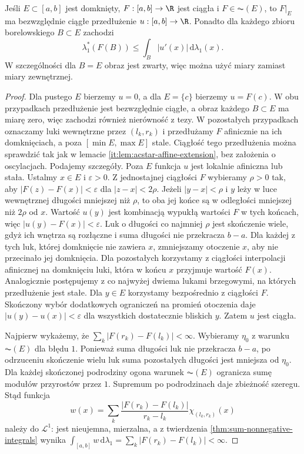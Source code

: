 \begin{lemat}\label{it:lem:ac-affine-extension}
Jeśli $E\subset[a,b]$ jest domknięty, $F:[a,b]\to\R$ jest ciągła i $F\in\AC(E)$, to $F|_E$ ma bezwzględnie ciągłe przedłużenie $u:[a,b]\to\R$. Ponadto dla każdego zbioru borelowskiego $B\subset E$ zachodzi
\[
 \lambda_1^*(F(B))\le\int_B|u'(x)|\,\mathrm d\lambda_1(x).
\]
W szczególności dla $B=E$ obraz jest zwarty, więc można użyć miary zamiast miary zewnętrznej.
\end{lemat}
\begin{proof}
Dla pustego $E$ bierzemy $u=0$, a dla $E=\{c\}$ bierzemy $u=F(c)$. W obu przypadkach przedłużenie jest bezwzględnie ciągłe, a obraz każdego $B\subset E$ ma miarę zero, więc zachodzi również nierówność z tezy. W pozostałych przypadkach oznaczamy luki wewnętrzne przez $(l_k,r_k)$ i przedłużamy $F$ afinicznie na ich domknięciach, a poza $[\min E,\max E]$ stale. Ciągłość tego przedłużenia można sprawdzić tak jak
w lemacie \ref{it:lem:acstar-affine-extension}, bez
założenia o oscylacjach. Podajemy szczegóły.
Poza $E$ funkcja $u$ jest lokalnie afiniczna lub stała.
Ustalmy $x\in E$ i $\varepsilon>0$. Z jednostajnej
ciągłości $F$ wybieramy $\rho>0$ tak, aby
$|F(z)-F(x)|<\varepsilon$ dla $|z-x|<2\rho$.
Jeżeli $|y-x|<\rho$ i $y$ leży w luce wewnętrznej
długości mniejszej niż $\rho$, to oba jej końce są
w odległości mniejszej niż $2\rho$ od $x$.
Wartość $u(y)$ jest kombinacją wypukłą wartości $F$
w tych końcach, więc $|u(y)-F(x)|<\varepsilon$.
Luk o długości co najmniej $\rho$ jest skończenie
wiele, gdyż ich wnętrza są rozłączne i suma długości
nie przekracza $b-a$. Dla każdej z tych luk, której
domknięcie nie zawiera $x$, zmniejszamy otoczenie
$x$, aby nie przecinało jej domknięcia. Dla pozostałych
korzystamy z ciągłości interpolacji afinicznej na
domknięciu luki, która w końcu $x$ przyjmuje wartość
$F(x)$. Analogicznie postępujemy z co najwyżej dwiema
lukami brzegowymi, na których przedłużenie jest stałe.
Dla $y\in E$ korzystamy bezpośrednio z ciągłości $F$.
Skończony wybór dodatkowych ograniczeń na promień
otoczenia daje $|u(y)-u(x)|<\varepsilon$ dla wszystkich
dostatecznie bliskich $y$. Zatem $u$ jest ciągła.

Najpierw wykażemy, że $\sum_k|F(r_k)-F(l_k)|<\infty$. Wybieramy $\eta_0$ z warunku $\AC(E)$ dla błędu $1$. Ponieważ suma długości luk nie przekracza $b-a$, po odrzuceniu skończenie wielu luk suma pozostałych długości jest mniejsza od $\eta_0$. Dla każdej skończonej podrodziny ogona warunek $\AC(E)$ ogranicza sumę modułów przyrostów przez $1$. Supremum po podrodzinach daje zbieżność szeregu.
Stąd funkcja
\[
 w(x)=\sum_k\frac{|F(r_k)-F(l_k)|}{r_k-l_k}\chi_{(l_k,r_k)}(x)
\]
należy do $\mathcal L^1$: jest nieujemna, mierzalna, a z twierdzenia \ref{thm:sum-nonnegative-integrals} wynika $\int_{[a,b]}w\,\mathrm d\lambda_1=\sum_k|F(r_k)-F(l_k)|<\infty$.


\end{proof}

